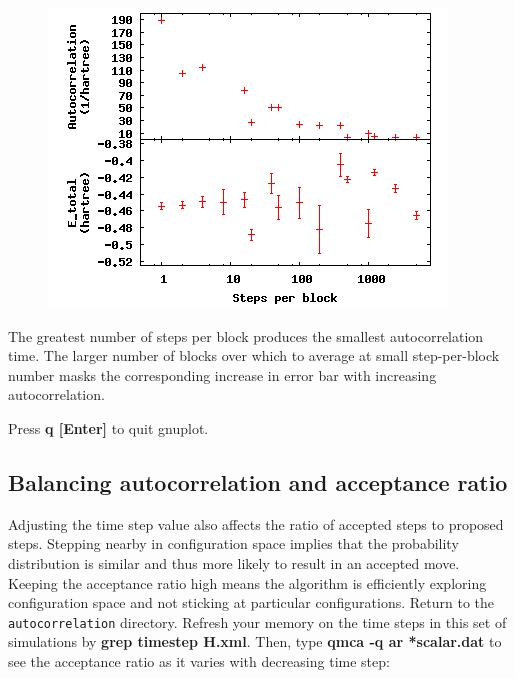 \FloatBarrier
\begin{figure}[ht!]
\begin{center}
\includegraphics[trim = 0mm 0mm 0mm 0mm, clip,width=0.75\columnwidth]{figures/lab_qmc_statistics_blocking2.png}
\end{center}
\end{figure}
\FloatBarrier


The greatest number of steps per block produces the smallest autocorrelation
time.  The larger number of blocks over which to average at small
step-per-block number masks the corresponding increase in error bar with
increasing autocorrelation.

Press \textbf{q [Enter]} to quit gnuplot.

\subsection{Balancing autocorrelation and acceptance ratio}

Adjusting the time step value also affects the ratio of accepted steps to
proposed steps.  Stepping nearby in configuration space implies that the
probability distribution is similar and thus more likely to result in an
accepted move.  Keeping the acceptance ratio high means the algorithm is
efficiently exploring configuration space and not sticking at particular
configurations.  Return to the \texttt{autocorrelation} directory.  Refresh your
memory on the time steps in this set of simulations by \textbf{grep timestep
H.xml}. Then, type \textbf{qmca -q ar *scalar.dat} to see the acceptance ratio
as it varies with decreasing time step:


